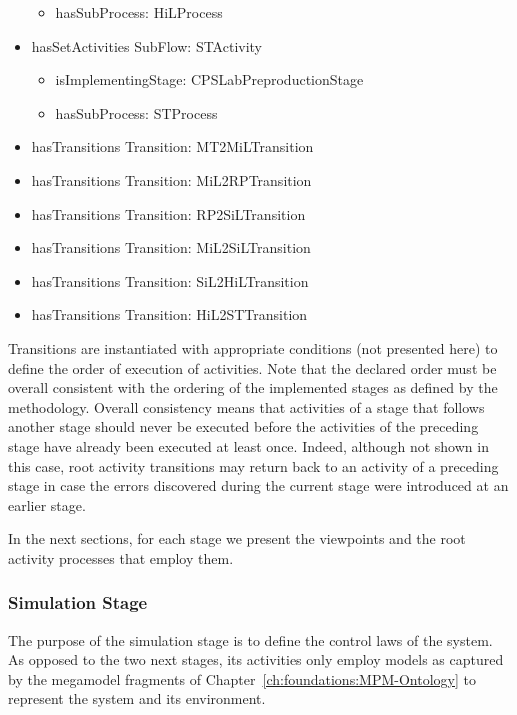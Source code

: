 \begin{itemize}
\begin{itemize}
            \item hasSubProcess: HiLProcess
        \end{itemize}
    \item hasSetActivities SubFlow: STActivity
        \begin{itemize}
            \item isImplementingStage: CPSLabPreproductionStage
            \item hasSubProcess: STProcess
        \end{itemize}
    \item hasTransitions Transition: MT2MiLTransition
    \item hasTransitions Transition: MiL2RPTransition
    \item hasTransitions Transition: RP2SiLTransition
    \item hasTransitions Transition: MiL2SiLTransition
    \item hasTransitions Transition: SiL2HiLTransition
    \item hasTransitions Transition: HiL2STTransition
\end{itemize}

Transitions are instantiated with appropriate conditions (not presented here) to define the order of execution of activities. Note that the declared order must be overall consistent with the ordering of the implemented stages as defined by the methodology. Overall consistency means that activities of a stage that follows another stage should never be executed before the activities of the preceding stage have already been executed at least once. Indeed, although not shown in this case, root activity transitions may return back to an activity of a preceding stage in case the errors discovered during the current stage were introduced at an earlier stage.

In the next sections, for each stage we present the viewpoints and the root activity processes that employ them.

\subsubsection{Simulation Stage}
%
The purpose of the simulation stage is to define the control laws of the system. As opposed to the two next stages, its activities only employ models as captured by the megamodel fragments of Chapter~\ref{ch:foundations:MPM-Ontology} to represent the system and its environment.

